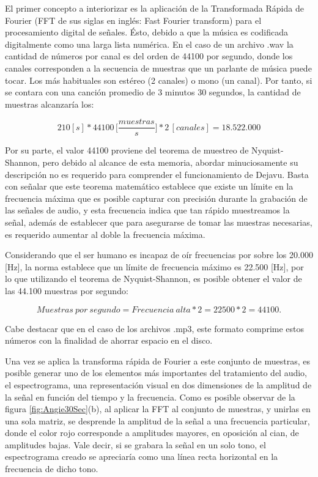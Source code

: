 El primer concepto a interiorizar es la aplicación de la Transformada Rápida de Fourier (FFT de sus siglas en inglés: Fast Fourier transform) para el procesamiento digital de señales. Ésto, debido a que la música es codificada digitalmente como una larga lista numérica. En el caso de un archivo .wav la cantidad de números por canal es del orden de 44100 por segundo, donde los canales corresponden a la secuencia de muestras que un parlante de música puede tocar. Los más habituales son estéreo (2 canales) o mono (un canal). Por tanto, si se contara con una canción promedio de 3 minutos 30 segundos, la cantidad de muestras alcanzaría los:

\begin{equation*}
210 [s]* 44100 \, \bigg[ \frac{muestras}{s} \bigg] *2 \, [canales] = 18.522.000
\end{equation*}

Por su parte, el valor 44100 proviene del teorema de muestreo de Nyquist-Shannon, pero debido al alcance de esta memoria, abordar minuciosamente su descripción no es requerido para comprender el funcionamiento de Dejavu. Basta con señalar que este teorema matemático establece que existe un límite en la frecuencia máxima que es posible capturar con precisión durante la grabación de las señales de audio, y esta frecuencia indica que tan rápido muestreamos la señal, además de establecer que para asegurarse de tomar las muestras necesarias, es requerido aumentar al doble la frecuencia máxima. 



Considerando que el ser humano es incapaz de oír frecuencias por sobre los 20.000 [Hz], la norma establece que un límite de frecuencia máximo es 22.500 [Hz], por lo que utilizando el teorema de Nyquist-Shannon, es posible obtener el valor de las 44.100 muestras por segundo:

\begin{equation*}
Muestras \: por \: segundo = Frecuencia \:  alta * 2 = 22500*2 = 44100.
\end{equation*}

Cabe destacar que en el caso de los archivos .mp3, este formato comprime estos números con la finalidad de ahorrar espacio en el disco.



Una vez se aplica la transforma rápida de Fourier a este conjunto de muestras, es posible generar uno de los elementos más importantes del tratamiento del audio, el espectrograma, una representación visual en dos dimensiones de la amplitud de la señal en función del tiempo y la frecuencia. Como es posible observar de la figura \ref{fig:Angie30Sec}(b), al aplicar la FFT al conjunto de muestras, y unirlas en una sola matriz, se desprende la amplitud de la señal a una frecuencia particular, donde el color rojo corresponde a amplitudes mayores, en oposición al cian, de amplitudes bajas. Vale decir, si se grabara la señal en un solo tono, el espectrograma creado se apreciaría como una línea recta horizontal en la frecuencia de dicho tono.


